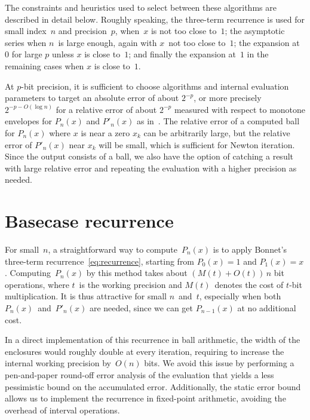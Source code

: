 \documentclass[11pt,a4paper]{article}
\begin{document}
The constraints and heuristics used to select between these algorithms
are described in detail below.
Roughly speaking,
the three-term recurrence is used for small index~$n$ and precision~$p$, when~$x$
is not too close to~$1$;
the asymptotic series when $n$~is large enough, again with $x$~not too
close to~$1$;
the expansion at~$0$ for large $p$ unless $x$ is close to~$1$;
and finally the expansion at~$1$ in the remaining cases
when $x$ is close to~$1$.

At $p$-bit precision, it is sufficient to choose algorithms
and internal evaluation parameters to target
an absolute error of about $2^{-p}$, or more precisely $2^{-p-O(\log n)}$
for a relative error of about $2^{-p}$ measured with respect
to monotone envelopes for $P_n(x)$ and $P'_n(x)$ as in~\cite{Bogaert2012}.
The relative error of a computed ball for $P_n(x)$ where $x$ is near a zero $x_k$
can be arbitrarily large, but the relative error of $P'_n(x)$ near $x_k$
will be small, which is sufficient for Newton iteration.
Since the output consists of a ball, we also have the option of catching
a result with large relative error and repeating the evaluation with a
higher precision as needed.

\section{Basecase recurrence}

\label{sec:recurrence}

For small $n$, a straightforward way to compute~$P_n(x)$ is to apply
Bonnet's three-term recurrence \eqref{eq:recurrence},
starting from $P_0(x)=1$ and $P_1(x) = x$.
Computing~$P_n(x)$ by this method takes about $(M(t) + O(t))\, n$
bit operations, where $t$ is the working precision and $M(t)$ denotes the
cost of $t$-bit multiplication.
It is thus attractive for small $n$ and $t$, especially when both
$P_n(x)$ and $P'_n(x)$ are needed, since we can get $P_{n-1}(x)$ at no
additional cost.

In a direct implementation of this recurrence in ball arithmetic, the
width of the enclosures would roughly double at every iteration,
requiring to increase the internal working precision by $O(n)$ bits.
We avoid this issue by performing a pen-and-paper round-off error
analysis of the evaluation that yields a less pessimistic bound on the
accumulated error.
Additionally, the static error bound allows us to implement the
recurrence in fixed-point arithmetic, avoiding the overhead of
interval operations.
\end{document}
